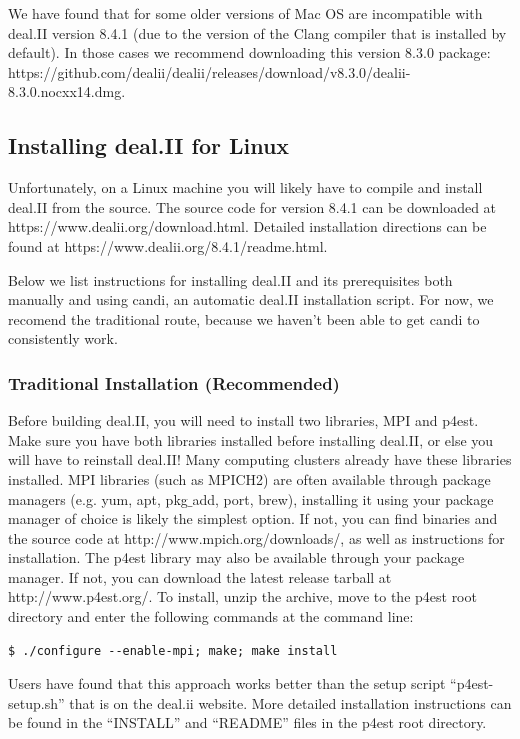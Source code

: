 \documentclass[10pt]{article} %
\begin{document}
We have found that for some older versions of Mac OS are incompatible with deal.II version 8.4.1 (due to the version of the Clang compiler that is installed by default). In those cases we recommend downloading this version 8.3.0 package:
\\ https://github.com/dealii/dealii/releases/download/v8.3.0/dealii-8.3.0.nocxx14.dmg.

\subsection{Installing deal.II for Linux}
Unfortunately, on a Linux machine you will likely have to compile and install deal.II from the source. The source code for version 8.4.1 can be downloaded at https://www.dealii.org/download.html. Detailed installation directions can be found at https://www.dealii.org/8.4.1/readme.html.

Below we list instructions for installing deal.II and its prerequisites both manually and using candi, an automatic deal.II installation script. For now, we recomend the traditional route, because we haven't been able to get candi to consistently work.

\subsubsection{Traditional Installation (Recommended)}
Before building deal.II, you will need to install two libraries, MPI and p4est. Make sure you have both libraries installed before installing deal.II, or else you will have to reinstall deal.II! Many computing clusters already have these libraries installed. MPI libraries (such as MPICH2) are often available through package managers (e.g. yum, apt, pkg$\_$add, port, brew), installing it using your package manager of choice is likely the simplest option. If not, you can find binaries and the source code at http://www.mpich.org/downloads/, as well as instructions for installation. The p4est library may also be available through your package manager. If not, you can download the latest release tarball at http://www.p4est.org/. To install, unzip the archive, move to the p4est root directory and enter the following commands at the command line:
\begin{lstlisting}
$ ./configure --enable-mpi; make; make install
\end{lstlisting}
Users have found that this approach works better than the setup script ``p4est-setup.sh'' that is on the deal.ii website. More detailed installation instructions can be found in the ``INSTALL'' and ``README'' files in the p4est root directory.
\end{document}
